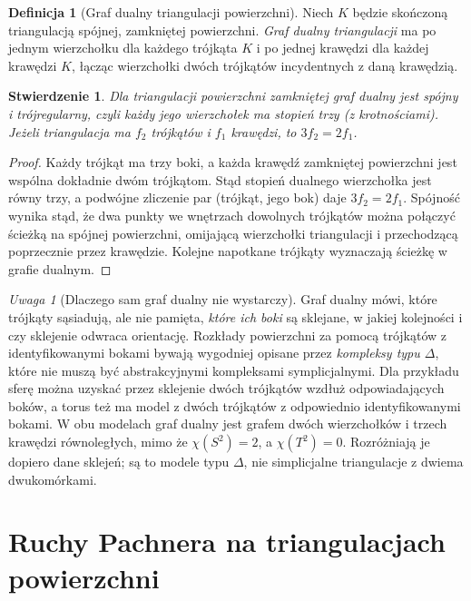 \documentclass[11pt,a4paper]{report}
\numberwithin{equation}{section}
\theoremstyle{plain}
\newtheorem{stwierdzenie}[twierdzenie]{Stwierdzenie}
\theoremstyle{definition}
\newtheorem{definicja}[twierdzenie]{Definicja}
\theoremstyle{remark}
\newtheorem{uwaga}[twierdzenie]{Uwaga}
\begin{document}
\begin{definicja}[Graf dualny triangulacji powierzchni]
Niech $K$ będzie skończoną triangulacją spójnej,
zamkniętej powierzchni. \emph{Graf dualny triangulacji}
ma po jednym wierzchołku dla każdego trójkąta $K$
i po jednej krawędzi dla każdej krawędzi $K$, łącząc
wierzchołki dwóch trójkątów incydentnych z daną krawędzią.
\end{definicja}

\begin{stwierdzenie}
Dla triangulacji powierzchni zamkniętej graf dualny jest
spójny i trójregularny, czyli każdy jego wierzchołek ma
stopień trzy (z krotnościami). Jeżeli triangulacja ma
$f_2$ trójkątów i $f_1$ krawędzi, to
$3f_2=2f_1$.
\end{stwierdzenie}

\begin{proof}
Każdy trójkąt ma trzy boki, a każda krawędź zamkniętej
powierzchni jest wspólna dokładnie dwóm trójkątom.
Stąd stopień dualnego wierzchołka jest równy trzy,
a podwójne zliczenie par (trójkąt, jego bok) daje
$3f_2=2f_1$. Spójność wynika stąd, że dwa punkty we
wnętrzach dowolnych trójkątów można połączyć ścieżką
na spójnej powierzchni, omijającą wierzchołki triangulacji
i przechodzącą poprzecznie przez krawędzie. Kolejne
napotkane trójkąty wyznaczają ścieżkę w grafie dualnym.
\end{proof}

\begin{uwaga}[Dlaczego sam graf dualny nie wystarczy]
Graf dualny mówi, które trójkąty sąsiadują, ale nie pamięta,
\emph{które ich boki} są sklejane, w jakiej kolejności i czy
sklejenie odwraca orientację. Rozkłady powierzchni za pomocą
trójkątów z identyfikowanymi bokami bywają wygodniej opisane
przez \emph{kompleksy typu $\Delta$}, które nie muszą być
abstrakcyjnymi kompleksami symplicjalnymi. Dla przykładu
sferę można uzyskać przez sklejenie dwóch trójkątów wzdłuż
odpowiadających boków, a torus też ma model z dwóch
trójkątów z odpowiednio identyfikowanymi bokami. W obu
modelach graf dualny jest grafem dwóch wierzchołków
i trzech krawędzi równoległych, mimo że
$\chi(S^2)=2$, a $\chi(T^2)=0$. Rozróżniają je dopiero
dane sklejeń; są to modele typu $\Delta$, nie simplicjalne
triangulacje z dwiema dwukomórkami.
\end{uwaga}

\section{Ruchy Pachnera na triangulacjach powierzchni}
\label{sec:tg-pachner}
\end{document}
